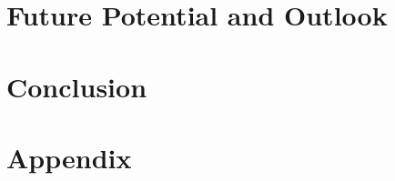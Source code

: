 \documentclass[12pt, a4paper]{article}
\begin{document}
\section{Future Potential and Outlook}\label{sec::outlook}
\section{Conclusion}\label{sec::conclusion}



\newpage
\singlespacing{}
\renewcommand{\thesubsection}{\Alph{subsection}}
\setcounter{page}{\value{lastroman}}
\section*{Appendix}


\newpage



\newpage
\listoffigures
\listoftables
\lstlistoflistings{}
\newpage

% 




\end{document}
